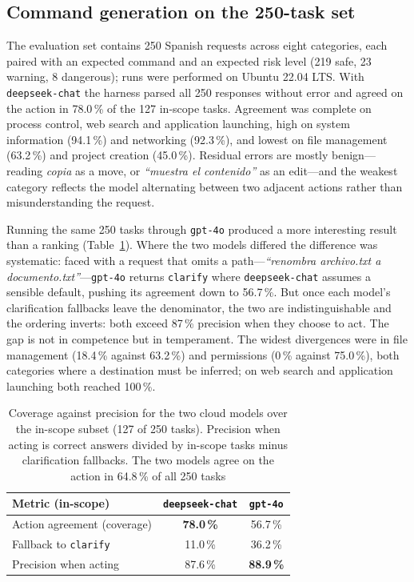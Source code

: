 \documentclass[10pt,a4paper]{article}
\begin{document}
\subsection{Command generation on the 250-task set}
\label{subsec:res-benchmark}

The evaluation set contains 250 Spanish requests across eight categories, each paired with an expected command and an expected risk level (219 safe, 23 warning, 8 dangerous); runs were performed on Ubuntu 22.04 LTS. With \texttt{deepseek-chat} the harness parsed all 250 responses without error and agreed on the action in 78.0\,\% of the 127 in-scope tasks. Agreement was complete on process control, web search and application launching, high on system information (94.1\,\%) and networking (92.3\,\%), and lowest on file management (63.2\,\%) and project creation (45.0\,\%). Residual errors are mostly benign---reading \textit{copia} as a move, or \textit{``muestra el contenido''} as an edit---and the weakest category reflects the model alternating between two adjacent actions rather than misunderstanding the request.

Running the same 250 tasks through \texttt{gpt-4o} produced a more interesting result than a ranking (Table~\ref{tab:models}). Where the two models differed the difference was systematic: faced with a request that omits a path---\textit{``renombra archivo.txt a documento.txt''}---\texttt{gpt-4o} returns \texttt{clarify} where \texttt{deepseek-chat} assumes a sensible default, pushing its agreement down to 56.7\,\%. But once each model's clarification fallbacks leave the denominator, the two are indistinguishable and the ordering inverts: both exceed 87\,\% precision when they choose to act. The gap is not in competence but in temperament. The widest divergences were in file management (18.4\,\% against 63.2\,\%) and permissions (0\,\% against 75.0\,\%), both categories where a destination must be inferred; on web search and application launching both reached 100\,\%.

\begin{table}[!ht]
    \centering
    \caption{Coverage against precision for the two cloud models over the in-scope subset (127 of 250 tasks). Precision when acting is correct answers divided by in-scope tasks minus clarification fallbacks. The two models agree on the action in 64.8\,\% of all 250 tasks}
    \label{tab:models}
    \fontsize{9}{10.8}\selectfont
    \begin{tabular}{lcc}
        \toprule
        \textbf{Metric (in-scope)} & \texttt{deepseek-chat} & \texttt{gpt-4o} \\
        \midrule
        Action agreement (coverage)     & \textbf{78.0\,\%} & 56.7\,\% \\
        Fallback to \texttt{clarify}    & 11.0\,\%          & 36.2\,\% \\
        Precision when acting           & 87.6\,\%          & \textbf{88.9\,\%} \\
        \bottomrule
    \end{tabular}
\end{table}
\end{document}
